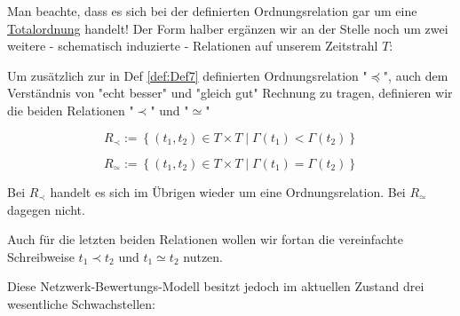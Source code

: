 \documentclass[11pt]{scrartcl}
\begin{document}
\vspace{1cm}

Man beachte, dass es sich bei der definierten Ordnungsrelation gar um eine \href{https://de.wikipedia.org/wiki/Ordnungsrelation#Totalordnung}{Totalordnung} handelt!
Der Form halber ergänzen wir an der Stelle noch um zwei weitere - schematisch induzierte - Relationen auf unserem Zeitstrahl $T$:

\vspace{0.3cm}

\begin{Def}\label{def:Def8}

Um zusätzlich zur in Def \ref{def:Def7} definierten Ordnungsrelation "$\preceq$", auch dem Verständnis von "echt besser" und "gleich gut" Rechnung zu tragen, definieren wir die beiden Relationen "$\prec$" und "$\simeq$"

\vspace{0.3cm}

\begin{equation*}
  R_{\prec}:= \left\{ (t_1, t_2) \in T \times T \mid \Gamma(t_1) < \Gamma(t_2) \right\}
\end{equation*}

\begin{equation*}
  R_{\simeq}:= \left\{ (t_1, t_2) \in T \times T \mid \Gamma(t_1) = \Gamma(t_2) \right\}
\end{equation*}

\vspace{1cm}

Bei $R_{\prec}$ handelt es sich im Übrigen wieder um eine Ordnungsrelation. Bei $R_{\simeq}$ dagegen nicht.

\end{Def}

\vspace{0.3cm}

Auch für die letzten beiden Relationen wollen wir fortan die vereinfachte Schreibweise $t_1 \prec t_2$ und $t_1 \simeq t_2$ nutzen. 

\vspace{1cm}

Diese Netzwerk-Bewertungs-Modell besitzt jedoch im aktuellen Zustand drei wesentliche Schwachstellen:
\end{document}
